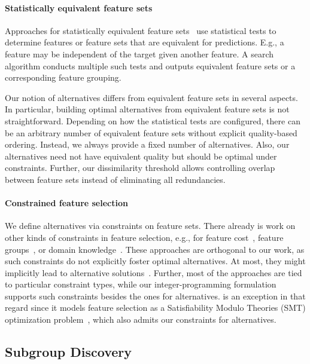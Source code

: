 \documentclass{article}
\theoremstyle{definition}
\begin{document}
\paragraph{Statistically equivalent feature sets}

Approaches for statistically equivalent feature sets~\cite{borboudakis2021extending, lagani2017feature} use statistical tests to determine features or feature sets that are equivalent for predictions.
E.g., a feature may be independent of the target given another feature.
A search algorithm conducts multiple such tests and outputs equivalent feature sets or a corresponding feature grouping.

Our notion of alternatives differs from equivalent feature sets in several aspects.
In particular, building optimal alternatives from equivalent feature sets is not straightforward.
Depending on how the statistical tests are configured, there can be an arbitrary number of equivalent feature sets without explicit quality-based ordering.
Instead, we always provide a fixed number of alternatives.
Also, our alternatives need not have equivalent quality but should be optimal under constraints.
Further, our dissimilarity threshold allows controlling overlap between feature sets instead of eliminating all redundancies.

\paragraph{Constrained feature selection}

We define alternatives via constraints on feature sets.
There already is work on other kinds of constraints in feature selection, e.g., for feature cost~\cite{paclik2002feature}, feature groups~\cite{yuan2006model}, or domain knowledge~\cite{bach2022empirical, groves2015toward}.
These approaches are orthogonal to our work, as such constraints do not explicitly foster optimal alternatives.
At most, they might implicitly lead to alternative solutions~\cite{bach2022empirical}.
Further, most of the approaches are tied to particular constraint types, while our integer-programming formulation supports such constraints besides the ones for alternatives.
\cite{bach2022empirical} is an exception in that regard since it models feature selection as a Satisfiability Modulo Theories (\textsc{SMT}) optimization problem~\cite{barrett2018satisfiability, nieuwenhuis2006sat}, which also admits our constraints for alternatives.

\subsection{Subgroup Discovery}
\label{sec:afs:related-work:subgroup-discovery}
\end{document}
